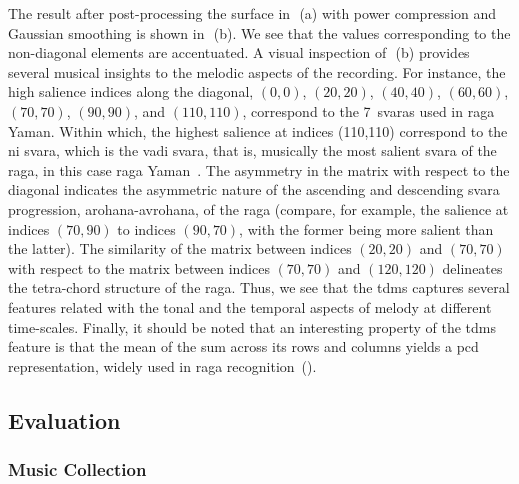 The result after post-processing the surface in~\,(a) with power compression and Gaussian smoothing is shown in~\,(b). We see that the values corresponding to the non-diagonal elements are accentuated. A visual inspection of~\,(b) provides several musical insights to the melodic aspects of the recording. For instance, the high salience indices along the diagonal, $(0,0)$, $(20,20)$, $(40,40)$, $(60,60)$, $(70,70)$, $(90,90)$, and $(110,110)$, correspond to the 7~\glspl{svara} used in \gls{raga} Yaman. Within which, the highest salience at indices (110,110) correspond to the \gls{ni} \gls{svara}, which is the \gls{vadi} \gls{svara}, that is, musically the most salient \gls{svara} of the \gls{raga}, in this case \gls{raga} Yaman~\citep{rao1999raga}. The asymmetry in the matrix with respect to the diagonal indicates the asymmetric nature of the ascending and descending \gls{svara} progression, \gls{arohana}-\gls{avrohana}, of the \gls{raga} (compare, for example, the salience at indices $(70, 90)$ to indices $(90, 70)$, with the former being more salient than the latter). The similarity of the matrix between indices $(20,20)$ and $(70,70)$ with respect to the matrix between indices $(70,70)$ and $(120,120)$ delineates the tetra-chord structure of the \gls{raga}. Thus, we see that the \gls{tdms} captures several features related with the tonal and the temporal aspects of melody at different time-scales. Finally, it should be noted that an interesting property of the \gls{tdms} feature is that the mean of the sum across its rows and columns yields a \gls{pcd} representation, widely used in \gls{raga} recognition~().



\subsection{Evaluation}
\label{sec:tdms_evaluation}

\subsubsection{Music Collection}
\label{sec:tdms_music_collection}


